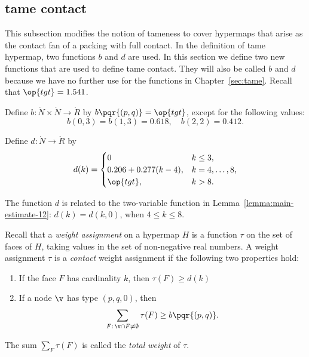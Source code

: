 \subsection{tame contact}

This subsection modifies the notion of tameness to cover hypermaps
that arise as the contact fan of a packing with full contact.  In the
definition of tame hypermap, two functions $b$ and $d$ are used.  In
this section we define two new functions that are used to define tame
contact.  They will also be called $b$ and $d$ because we have no
further use for the functions in Chapter~\ref{sec:tame}.  
Recall that $\op{tgt}=1.541$.
%
%

\begin{definition}[b]
  Define $b:\ring{N}\times \ring{N}\to \ring{R}$ by
  $b\pqr{(p,q)}=\op{tgt}$, except for the following values:
\[
b(0,3)=b(1,3)=0.618,\quad b(2,2)=0.412.
\]
\end{definition}
%

\begin{definition}[d]
Define $d:\ring{N}\to \ring{R}$ by
\[d(k) = \begin{cases}
0 & k\le 3, \\
0.206 + 0.277 (k-4),& k=4,\ldots,8,\\
\op{tgt},& k>8.\\
\end{cases}
\]
\end{definition}
%

The function $d$ is related to the two-variable function in
Lemma~\ref{lemma:main-estimate-12}: $d(k) = d(k,0)$, when $4\le k\le
8$.

\begin{definition}
%
  Recall that a {\it weight assignment\/} on a hypermap $H$ is a
  function $\tau$ on the set of faces of $H$, taking values in the set
  of non-negative real numbers. A weight assignment $\tau$
is a {\it contact}
  weight assignment if the following two properties hold:
%
\begin{enumerate}
\item If the face $F$ has cardinality $k$, then
$\tau(F) \ge d(k)$
\item If a node $\v$ has type $(p,q,0)$, then
  \[\sum_{F:\,\v\cap F\ne\emptyset} \tau(F) \ge
    b{\pqr{(p,q)}}.\]
\end{enumerate}
The sum $\sum_F \tau(F)$ is called the {\it total weight} of $\tau$.
%
\end{definition}


